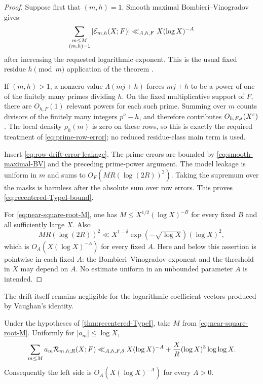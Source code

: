 \begin{proof}
Suppose first that $(m,h)=1$.  Smooth maximal
Bombieri--Vinogradov gives
\begin{equation}
 \sum_{\substack{m\le M\\(m,h)=1}}|\mathcal E_{m,h}(X;F)|
 \ll_{A,h,F}X(\log X)^{-A}
 \label{eq:smooth-maximal-BV}
\end{equation}
after increasing the requested logarithmic exponent.  This is the usual
fixed residue $h\pmod m$ application of the theorem
\citep{Bombieri1965,Vinogradov1965,MontgomeryVaughan2007}.

If $(m,h)>1$, a nonzero value $\Lambda(mj+h)$ forces $mj+h$ to be a
power of one of the finitely many primes dividing $h$.  On the fixed
multiplicative support of $F$, there are $O_{h,F}(1)$ relevant powers for
each such prime.  Summing over $m$ counts divisors of the finitely many
integers $p^a-h$, and therefore contributes
$O_{h,F,\varepsilon}(X^\varepsilon)$.  The local density $\rho_h(m)$ is zero on these
rows, so this is exactly the required treatment of
\eqref{eq:prime-row-error}; no reduced residue-class main term is used.

Insert \eqref{eq:row-drift-error-leakage}.  The prime errors are bounded
by \eqref{eq:smooth-maximal-BV} and the preceding prime-power argument.
The model leakage is uniform in $m$ and sums to
$O_F(MR(\log(2R))^2)$.  Taking the supremum over the masks is harmless
after the absolute sum over row errors.  This proves
\eqref{eq:recentered-TypeI-bound}.

For \eqref{eq:near-square-root-M}, one has
$M\le X^{1/2}(\log X)^{-B}$ for every fixed $B$ and all sufficiently
large $X$.  Also
\[
 MR(\log(2R))^2
 \ll X^{1-\delta}\exp(-\sqrt{\log X})(\log X)^2,
\]
which is $O_A(X(\log X)^{-A})$ for every fixed $A$.
Here and below this assertion is pointwise in each fixed $A$: the
Bombieri--Vinogradov exponent and the threshold in $X$ may depend on
$A$.  No estimate uniform in an unbounded parameter $A$ is intended.
\end{proof}

The drift itself remains negligible for the logarithmic coefficient
vectors produced by Vaughan's identity.

\begin{corollary}
\label{cor:bounded-log-rows}
Under the hypotheses of \cref{thm:recentered-TypeI}, take $M$ from
\eqref{eq:near-square-root-M}.  Uniformly for $|a_m|\le\log X$,
\begin{equation}
 \sum_{m\le M}a_m\mathcal R_{m,h;R}(X;F)
 \ll_{A,h,F,\delta}X(\log X)^{-A}
 +\frac XR(\log X)^3\log\log X.
 \label{eq:bounded-log-raw-row-bound}
\end{equation}
Consequently the left side is $O_A(X(\log X)^{-A})$ for every $A>0$.
\end{corollary}

